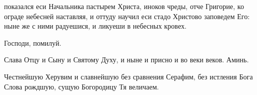 \begin{mymulticols}
\vspace{-\baselineskip}

\slava

{ показался еси Начальника пастырем Христа, иноков чреды, отче Григорие, ко ограде небесней наставляя, и оттуду научил еси стадо Христово заповедем Его: ныне же с ними радуешися, и ликуеши в небесных кровех.}

\inyne


Господи, помилуй. 

Слава Отцу и Сыну и Святому Духу, и ныне и присно и во веки веков. Аминь.

Честнейшую Херувим и славнейшую без сравнения Серафим, без истления Бога Слова рождшую, сущую Богородицу Тя величаем.


\end{mymulticols}

\mychapterending

\begin{mymulticols}

\SymbolOfFaith

\end{mymulticols}

\mychapterending

